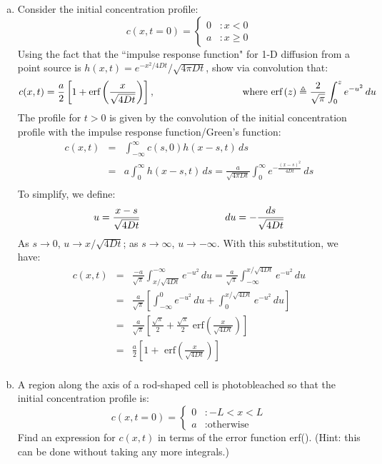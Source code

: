 \documentclass{article}
\begin{document}
\begin{enumerate}[a)]
\item Consider the initial concentration profile:
\[ c(x,t=0) = \left\{
     \begin{array}{lr}
       0 & : x < 0\\
       a & : x \geq 0
     \end{array}
   \right. \]
Using the fact that the ``impulse response function" for 1-D diffusion from a point source is $h(x,t)=e^{-x^2/4Dt}/\sqrt{4\pi D t}$, show via convolution that:
\[ c(x,t) = \frac{a}{2} \left[ 1 + \textrm{erf} \left( \frac{x}{\sqrt{4Dt}} \right)\right], \hspace{3 cm} \textrm{ where }\textrm{erf} \left( z \right) \triangleq \frac{2}{\sqrt{\pi}} \int_0^z e^{-u^2} \, du \]
{\color{red}
The profile for $t>0$ is given by the convolution of the initial concentration profile with the impulse response function/Green's function:
\begin{eqnarray*}
c(x,t) & = & \int_{-\infty}^{\infty} c(s,0) h(x - s,t) \, ds\\
& = & a \int_{0}^{\infty} h(x-s,t) \, ds = \frac{a}{\sqrt{4\pi D t}} \int_0^{\infty} e^{-\frac{(x-s)^2}{4Dt}} \, ds  \\
\end{eqnarray*}
To simplify, we define:
\[ u = \frac{x-s}{\sqrt{4Dt}} \hspace{3 cm} du = - \frac{ds}{\sqrt{4Dt}} \]
As $s \to 0$, $u \to x/\sqrt{4Dt}$; as $s \to \infty$, $u \to -\infty$. With this substitution, we have:
\begin{eqnarray*}
c(x,t) & = & \frac{-a}{\sqrt{\pi}} \int_{x/\sqrt{4Dt}}^{-\infty} e^{-u^2} \, du  = \frac{a}{\sqrt{\pi}} \int_{-\infty}^{x/\sqrt{4Dt}} e^{-u^2} \, du \\
& = & \frac{a}{\sqrt{\pi}} \left[\int_{-\infty}^{0} e^{-u^2} \, du +  \int_{0}^{x/\sqrt{4Dt}} e^{-u^2} \, du \right]\\
& = & \frac{a}{\sqrt{\pi}} \left[\frac{\sqrt{\pi}}{2} +  \frac{\sqrt{\pi}}{2} \textrm{ erf} \left( \frac{x}{\sqrt{4Dt}} \right) \right]\\
& = & \frac{a}{2} \left[1 +  \textrm{ erf} \left( \frac{x}{\sqrt{4Dt}} \right) \right]\\
\end{eqnarray*}
}
\item A region along the axis of a rod-shaped cell is photobleached so that the initial concentration profile is:
\[ c(x,t=0) = \left\{
     \begin{array}{lr}
       0 & : -L < x < L\\
       a & : \textrm{otherwise}
     \end{array}
   \right. \]
Find an expression for $c(x,t)$ in terms of the error function erf(). (Hint:  this can be done without taking any more integrals.)\\


\end{enumerate}
\end{document}
